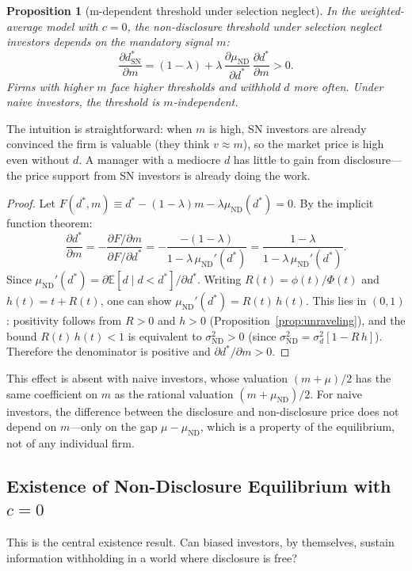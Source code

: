 \documentclass[12pt]{article}
\theoremstyle{plain}
\newtheorem{proposition}{Proposition}
\theoremstyle{definition}
\newcommand{\E}{\mathbb{E}}
\newcommand{\ND}{\mathrm{ND}}
\newcommand{\SN}{\mathrm{SN}}
\begin{document}
\begin{proposition}[m-dependent threshold under selection neglect]
\label{prop:m_dependent}
In the weighted-average model with $c = 0$, the non-disclosure threshold under selection neglect investors depends on the mandatory signal $m$:
\[
\frac{\partial d^*_\SN}{\partial m} = (1-\lambda) + \lambda\,\frac{\partial \mu_{\ND}}{\partial d^*}\,\frac{\partial d^*}{\partial m} > 0.
\]
Firms with higher $m$ face higher thresholds and withhold $d$ more often. Under naive investors, the threshold is $m$-independent.
\end{proposition}

The intuition is straightforward: when $m$ is high, SN investors are already convinced the firm is valuable (they think $v \approx m$), so the market price is high even without $d$. A manager with a mediocre $d$ has little to gain from disclosure---the price support from SN investors is already doing the work.

\begin{proof}
Let $F(d^*, m) \equiv d^* - (1-\lambda)m - \lambda\mu_{\ND}(d^*) = 0$. By the implicit function theorem:
\[
\frac{\partial d^*}{\partial m} = -\frac{\partial F/\partial m}{\partial F/\partial d^*} = -\frac{-(1-\lambda)}{1 - \lambda\,\mu_{\ND}'(d^*)} = \frac{1-\lambda}{1 - \lambda\,\mu_{\ND}'(d^*)}.
\]
Since $\mu_{\ND}'(d^*) = \partial \E[d \mid d < d^*]/\partial d^*$. Writing $R(t) = \phi(t)/\Phi(t)$ and $h(t) = t + R(t)$, one can show $\mu_{\ND}'(d^*) = R(t)\,h(t)$. This lies in $(0,1)$: positivity follows from $R > 0$ and $h > 0$ (Proposition~\ref{prop:unraveling}), and the bound $R(t)\,h(t) < 1$ is equivalent to $\sigma_{\ND}^2 > 0$ (since $\sigma_{\ND}^2 = \sigma_d^2[1 - R\,h]$). Therefore the denominator is positive and $\partial d^*/\partial m > 0$.
\end{proof}

This effect is absent with naive investors, whose valuation $(m + \mu)/2$ has the same coefficient on $m$ as the rational valuation $(m + \mu_{\ND})/2$. For naive investors, the difference between the disclosure and non-disclosure price does not depend on $m$---only on the gap $\mu - \mu_{\ND}$, which is a property of the equilibrium, not of any individual firm.


\subsection{Existence of Non-Disclosure Equilibrium with $c = 0$}

This is the central existence result. Can biased investors, by themselves, sustain information withholding in a world where disclosure is free?
\end{document}
